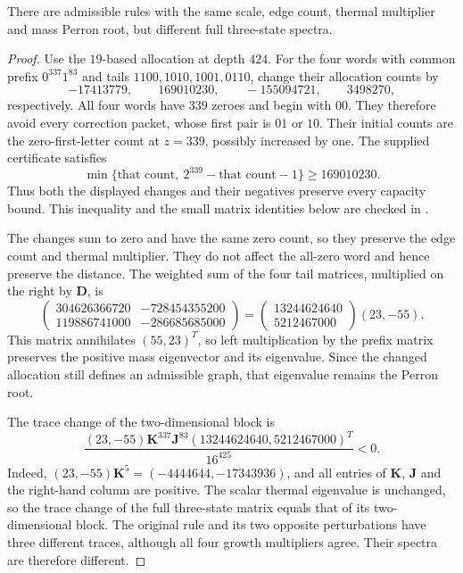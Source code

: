 \begin{proposition}\label{prop:spectral-redundancy}
There are admissible rules with the same scale, edge count, thermal multiplier and mass Perron root, but different full three-state spectra.
\end{proposition}
\begin{proof}
Use the $19$-based allocation at depth $424$. For the four words with common prefix $0^{337}1^{83}$ and tails $1100,1010,1001,0110$, change their allocation counts by
\[
 -17413779,\qquad169010230,\qquad-155094721,\qquad3498270,
\]
respectively. All four words have $339$ zeroes and begin with $00$. They therefore avoid every correction packet, whose first pair is $01$ or $10$. Their initial counts are the zero-first-letter count at $z=339$, possibly increased by one. The supplied certificate satisfies
\[
 \min\{\text{that count},\ 2^{339}-\text{that count}-1\}
 \ge169010230.
\]
Thus both the displayed changes and their negatives preserve every capacity bound. This inequality and the small matrix identities below are checked in .

The changes sum to zero and have the same zero count, so they preserve the edge count and thermal multiplier. They do not affect the all-zero word and hence preserve the distance. The weighted sum of the four tail matrices, multiplied on the right by $\mathbf D$, is
\[
 \begin{pmatrix}
 304626366720&-728454355200\\
 119886741000&-286685685000
 \end{pmatrix}
 =\begin{pmatrix}13244624640\\5212467000\end{pmatrix}(23,-55).
\]
This matrix annihilates $(55,23)^T$, so left multiplication by the prefix matrix preserves the positive mass eigenvector and its eigenvalue. Since the changed allocation still defines an admissible graph, that eigenvalue remains the Perron root.

The trace change of the two-dimensional block is
\[
 \frac{(23,-55)\mathbf K^{337}\mathbf J^{83}
       (13244624640,5212467000)^T}{16^{425}}<0.
\]
Indeed, $(23,-55)\mathbf K^5=(-4444644,-17343936)$, and all entries of $\mathbf K$, $\mathbf J$ and the right-hand column are positive. The scalar thermal eigenvalue is unchanged, so the trace change of the full three-state matrix equals that of its two-dimensional block. The original rule and its two opposite perturbations have three different traces, although all four growth multipliers agree. Their spectra are therefore different.
\end{proof}
